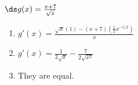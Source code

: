 {$\ds g(x) = \frac{x+7}{\sqrt{x}}$
}
{\begin{enumerate}
\item $g'(x)= \frac{\sqrt{x}(1)-(x+7)\left(\frac{1}{2}x^{-1/2}\right)}{x}$
\item $g'(x) = \frac{1}{2\sqrt{x}}-\frac{7}{2\sqrt{x^3}}$
\item They are equal.
\end{enumerate}
}
